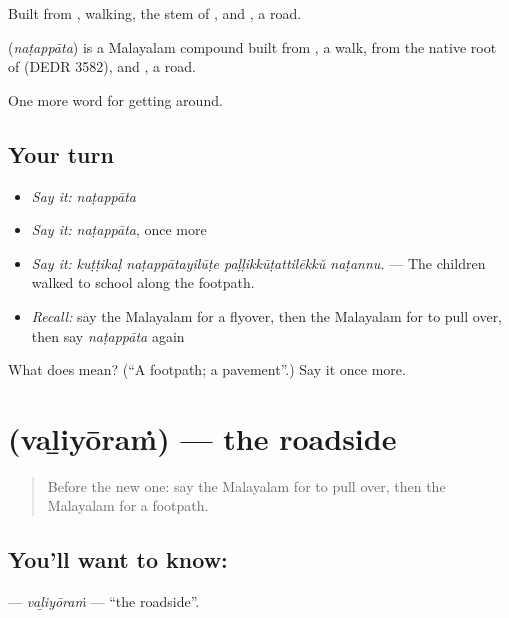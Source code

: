 Built from , walking, the stem of , and , a road.

\begin{cousinweb}
\textbf{} (\emph{naṭappāta}) is a Malayalam compound built from , a walk, from the native root of  (DEDR 3582), and , a road.
\end{cousinweb}

\begin{grammarlens}[title={What you've built}]
One more word for getting around.
\end{grammarlens}

\subsection*{Your turn}
\begin{itemize}
\raggedright
  \item \emph{Say it:} \emph{naṭappāta}
  \item \emph{Say it:} \emph{naṭappāta}, once more
  \item \emph{Say it:} \emph{kuṭṭikaḷ naṭappātayilūṭe paḷḷikkūṭattilēkkŭ naṭannu.} — The children walked to school along the footpath.
  \item \emph{Recall:} say the Malayalam for a flyover, then the Malayalam for to pull over, then say \emph{naṭappāta} again
\end{itemize}

\begin{tcolorbox}[breakable,colback=teal!4,colframe=teal!35!black,title={Before you move on}]
What does  mean? (\textquotedblleft{}A footpath; a pavement\textquotedblright{}.) Say it once more.
\end{tcolorbox}
\section[\texorpdfstring{\ml{വഴിയോരം} (vaḻiyōraṁ)}{വഴിയോരം (vaḻiyōraṁ)}]{ (vaḻiyōraṁ) — the roadside}

\label{lesson:ML-C469-valiyoram}



\begin{quote}
Before the new one: say the Malayalam for to pull over, then the Malayalam for a footpath.
\end{quote}

\subsection*{You'll want to know: }
\textbf{} — \emph{vaḻiyōraṁ} — \textquotedblleft{}the roadside\textquotedblright{}.

